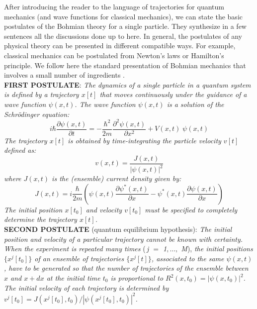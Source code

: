 \documentclass[onecolumn,nofootinbib, secnumarabic, amsmath, nobibnotes,12pt,aps,pra]{revtex4-1}
\begin{document}
After introducing the reader to the language of trajectories for
quantum mechanics (and wave functions for classical mechanics), we
can state the basic postulates of the Bohmian theory  for a single particle. They synthesize in
a few sentences all the discussions done up to here. In general, the
postulates of any physical theory can be presented in different
compatible ways. For example, classical mechanics can be postulated
from Newton's laws or Hamilton's principle. We follow here the
standard presentation of Bohmian mechanics that involves a small
number of ingredients
\cite{om.Holand1993,om.Valentini2006,om.appraisal,om.Durrllibre}.\\

\noindent\textbf{FIRST POSTULATE}: \textit{The dynamics of a single particle in a quantum system is defined by a trajectory $x[t]$ that moves continuously under the guidance of a wave function $\psi(x,t)$.
The wave function $\psi(x,t)$ is a solution of the Schr\"odinger equation:}
\begin{equation*}
i \hbar \frac{\partial \psi(x,t)} {\partial t} = -\frac {\hbar^2} {2m} \frac{ {\partial}^2 \psi(x,t)} {\partial x^2} + V(x,t) \;\psi(x,t)
\end{equation*}
\textit{The trajectory $x[t]$ is obtained by time-integrating the particle velocity $v[t]$ defined as:}
\begin{equation*}
v(x,t) = \frac{J(x,t)} {|\psi(x,t)|^2}
\end{equation*}
\textit{where $J(x,t)$ is the (ensemble) current density given by:}
\begin{equation*}
J(x,t) = i \frac {\hbar} {2 m} \left(\psi(x,t) \frac {\partial \psi^{*}(x,t)} {\partial x}- \psi^{*}(x,t) \frac {\partial \psi(x,t)} {\partial x} \right)
\end{equation*}
\textit{The initial position $x[t_0]$ and velocity $v[t_0]$ must be specified to completely determine the trajectory $x[t]$.} \\

\noindent\textbf{SECOND POSTULATE} (quantum equilibrium hypothesis): \textit{The initial position and velocity of a particular trajectory cannot be known with certainty. When the experiment is repeated many times}  (\textit{\,j $=$ 1$,\ldots,$ M}), \textit{the initial positions $\{ x^j[t_0] \}$ of an ensemble of trajectories $\{x^j[t] \}$, associated to the same $\psi(x,t)$, have to be generated so that the number of trajectories of the ensemble between $x$ and $x + dx$ at the initial time $t_0$ is proportional to $R^2(x,t_0) = |\psi(x,t_0)|^2$. The initial velocity of each trajectory is determined by $v^j[t_0] = J(x^j[t_0],t_0)/|\psi(x^j[t_0],t_0)|^2$.}\\
\end{document}
